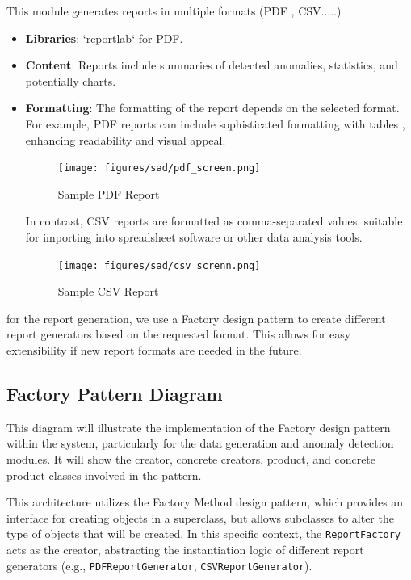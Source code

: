 This module generates reports in multiple formats (PDF , CSV.....)
\begin{itemize}
    \item \textbf{Libraries}: `reportlab` for PDF.
    \item \textbf{Content}: Reports include summaries of detected anomalies, statistics, and potentially charts.
    \item \textbf{Formatting}: The formatting of the report depends on the selected format. For example, PDF reports can include sophisticated formatting with tables , enhancing readability and visual appeal. 

\begin{figure}[H]
    \centering
    \texttt{[image: figures/sad/pdf\_screen.png]}
    \caption{Sample PDF Report}
    \label{fig:pdf_report_screenshot}
\end{figure}

In contrast, CSV reports are formatted as comma-separated values, suitable for importing into spreadsheet software or other data analysis tools. 

\begin{figure}[H]
    \centering
    \texttt{[image: figures/sad/csv\_screnn.png]}
    \caption{Sample CSV Report}
    \label{fig:csv_report_screenshot}
\end{figure}
\end{itemize}

for the report generation, we use a Factory design pattern to create different report generators based on the requested format. This allows for easy extensibility if new report formats are needed in the future.
\subsection{Factory Pattern Diagram}
This diagram will illustrate the implementation of the Factory design pattern within the system, particularly for the data generation and anomaly detection modules. It will show the creator, concrete creators, product, and concrete product classes involved in the pattern.

This architecture utilizes the Factory Method design pattern, which provides an interface for creating objects in a superclass, but allows subclasses to alter the type of objects that will be created. In this specific context, the \texttt{ReportFactory} acts as the creator, abstracting the instantiation logic of different report generators (e.g., \texttt{PDFReportGenerator}, \texttt{CSVReportGenerator}).

